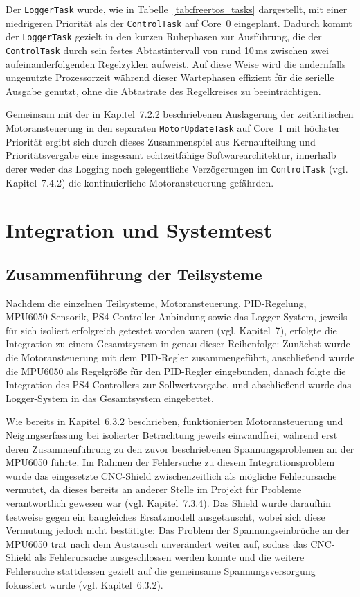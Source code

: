 \documentclass[12pt,ngerman,numbers=noenddot,abstracton,headsepline]{scrreprt}
\begin{document}
Der \texttt{LoggerTask} wurde, wie in Tabelle~\ref{tab:freertos_tasks} dargestellt, mit einer niedrigeren Priorität als der \texttt{ControlTask} auf Core~0 eingeplant. Dadurch kommt der \texttt{LoggerTask} gezielt in den kurzen Ruhephasen zur Ausführung, die der \texttt{ControlTask} durch sein festes Abtastintervall von rund 10\,ms zwischen zwei aufeinanderfolgenden Regelzyklen aufweist. Auf diese Weise wird die andernfalls ungenutzte Prozessorzeit während dieser Wartephasen effizient für die serielle Ausgabe genutzt, ohne die Abtastrate des Regelkreises zu beeinträchtigen.

Gemeinsam mit der in Kapitel~7.2.2 beschriebenen Auslagerung der zeitkritischen Motoransteuerung in den separaten \texttt{MotorUpdateTask} auf Core~1 mit höchster Priorität ergibt sich durch dieses Zusammenspiel aus Kernaufteilung und Prioritätsvergabe eine insgesamt echtzeitfähige Softwarearchitektur, innerhalb derer weder das Logging noch gelegentliche Verzögerungen im \texttt{ControlTask} (vgl. Kapitel~7.4.2) die kontinuierliche Motoransteuerung gefährden.

\chapter{Integration und Systemtest}
\label{ch:integration}

\section{Zusammenführung der Teilsysteme}
\label{sec:zusammenfuehrung}

Nachdem die einzelnen Teilsysteme, Motoransteuerung, PID-Regelung, MPU6050-Sensorik, PS4-Controller-Anbindung sowie das Logger-System, jeweils für sich isoliert erfolgreich getestet worden waren (vgl. Kapitel~7), erfolgte die Integration zu einem Gesamtsystem in genau dieser Reihenfolge: Zunächst wurde die Motoransteuerung mit dem PID-Regler zusammengeführt, anschließend wurde die MPU6050 als Regelgröße für den PID-Regler eingebunden, danach folgte die Integration des PS4-Controllers zur Sollwertvorgabe, und abschließend wurde das Logger-System in das Gesamtsystem eingebettet.

Wie bereits in Kapitel~6.3.2 beschrieben, funktionierten Motoransteuerung und Neigungserfassung bei isolierter Betrachtung jeweils einwandfrei, während erst deren Zusammenführung zu den zuvor beschriebenen Spannungsproblemen an der MPU6050 führte. Im Rahmen der Fehlersuche zu diesem Integrationsproblem wurde das eingesetzte CNC-Shield zwischenzeitlich als mögliche Fehlerursache vermutet, da dieses bereits an anderer Stelle im Projekt für Probleme verantwortlich gewesen war (vgl. Kapitel~7.3.4). Das Shield wurde daraufhin testweise gegen ein baugleiches Ersatzmodell ausgetauscht, wobei sich diese Vermutung jedoch nicht bestätigte: Das Problem der Spannungseinbrüche an der MPU6050 trat nach dem Austausch unverändert weiter auf, sodass das CNC-Shield als Fehlerursache ausgeschlossen werden konnte und die weitere Fehlersuche stattdessen gezielt auf die gemeinsame Spannungsversorgung fokussiert wurde (vgl. Kapitel~6.3.2).
\end{document}
